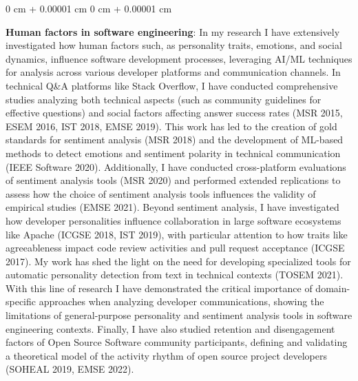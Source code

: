 \documentclass[10pt, a4paper]{article}
\newenvironment{onecolentry}{
    \begin{adjustwidth}{
        0 cm + 0.00001 cm
    }{
        0 cm + 0.00001 cm
    }
}{
    \end{adjustwidth}
} %
\begin{document}
        \vspace{0.2 cm}

        \begin{onecolentry}
            \textbf{Human factors in software engineering}: In my research I have extensively investigated how human factors such, as personality traits, emotions, and social dynamics, influence software development processes, leveraging AI/ML techniques for analysis across various developer platforms and communication channels. In technical Q\&A platforms like Stack Overflow, I have conducted comprehensive studies analyzing both technical aspects (such as community guidelines for effective questions) and social factors affecting answer success rates (MSR 2015, ESEM 2016, IST 2018, EMSE 2019). This work has led to the creation of gold standards for sentiment analysis (MSR 2018) and the development of ML-based methods to detect emotions and sentiment polarity in technical communication (IEEE Software 2020). Additionally, I have conducted cross-platform evaluations of sentiment analysis tools (MSR 2020) and performed extended replications to assess how the choice of sentiment analysis tools influences the validity of empirical studies (EMSE 2021). Beyond sentiment analysis, I have investigated how developer personalities influence collaboration in large software ecosystems like Apache (ICGSE 2018, IST 2019), with particular attention to how traits like agreeableness impact code review activities and pull request acceptance (ICGSE 2017). My work has shed the light on the need for developing specialized tools for automatic personality detection from text in technical contexts (TOSEM 2021). With this line of research I have demonstrated the critical importance of domain-specific approaches when analyzing developer communications, showing the limitations of general-purpose personality and sentiment analysis tools in software engineering contexts. Finally, I have also studied retention and disengagement factors of Open Source Software community participants, defining and validating a theoretical model of the activity rhythm of open source project developers (SOHEAL 2019, EMSE 2022).
        \end{onecolentry}

        \vspace{0.2 cm}
\end{document}

